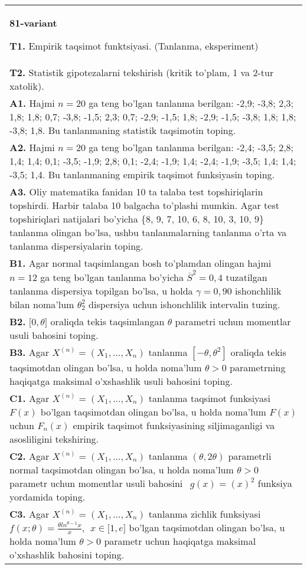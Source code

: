 \documentclass{article}
\begin{document}
\begin{tabular}{m{17cm}}
\textbf{81-variant}
\newline

\textbf{T1.} 
Empirik taqsimot funktsiyasi. (Tanlanma, eksperiment)
\\
\textbf{T2.} 
Statistik gipotezalarni tekshirish (kritik to'plam, 1 va 2-tur xatolik).
\\
\textbf{A1.} 
Hajmi \(n = 20\) ga teng bo'lgan tanlanma berilgan: -2,9; -3,8; 2,3; 1,8; 1,8; 0,7; -3,8; -1,5; 2,3; 0,7; -2,9; -1,5; 1,8; -2,9; -1,5; -3,8; 1,8; 1,8; -3,8; 1,8. Bu tanlanmaning statistik taqsimotin toping.
\\
\textbf{A2.} 
Hajmi \(n = 20\) ga teng bo'lgan tanlanma berilgan: -2,4; -3,5; 2,8; 1,4; 1,4; 0,1; -3,5; -1,9; 2,8; 0,1; -2,4; -1,9; 1,4; -2,4; -1,9; -3,5; 1,4; 1,4; -3,5; 1,4. Bu tanlanmaning empirik taqsimot funksiyasin toping.
\\
\textbf{A3.} 
Oliy matematika fanidan 10 ta talaba test topshiriqlarin topshirdi. Harbir talaba 10 balgacha to'plashi mumkin. Agar test topshiriqlari natijalari bo'yicha \{8, 9, 7, 10, 6, 8, 10, 3, 10, 9\} tanlanma olingan bo'lsa, ushbu tanlanmalarning tanlanma o'rta va tanlanma dispersiyalarin toping.
\\
\textbf{B1.} 
Agar normal taqsimlangan bosh to'plamdan olingan hajmi \(n = 12\) ga teng bo'lgan tanlanma bo'yicha \({\overline{S}}^{2} = 0,4\) tuzatilgan tanlanma dispersiya topilgan bo'lsa, u holda \(\gamma = 0,90\) ishonchlilik bilan noma'lum \(\theta_{2}^{2}\) dispersiya uchun ishonchlilik intervalin tuzing.
\\
\textbf{B2.} 
\(\lbrack 0,\theta\rbrack\) oraliqda tekis taqsimlangan \(\theta\) parametri uchun momentlar usuli bahosini toping.
\\
\textbf{B3.} 
Agar \(X^{(n)} = \left( X_{1},...,X_{n} \right)\) tanlanma \(\left\lbrack - \theta,\theta^{2} \right\rbrack\) oraliqda tekis taqsimotdan olingan bo'lsa, u holda noma'lum \(\theta > 0\) parametrning haqiqatga maksimal o'xshashlik usuli bahosini toping.
\\
\textbf{C1.} 
Agar \(X^{(n)} = \left( X_{1},...,X_{n} \right)\) tanlanma taqsimot funksiyasi \(F(x)\) bo'lgan taqsimotdan olingan bo'lsa, u holda noma'lum \(F(x)\) uchun \(F_{n}(x)\) empirik taqsimot funksiyasining siljimaganligi va asosliligini tekshiring.
\\
\textbf{C2.} 
Agar \(X^{(n)} = \left( X_{1},...,X_{n} \right)\) tanlanma \((\theta,2\theta)\) parametrli normal taqsimotdan olingan bo'lsa, u holda noma'lum \(\theta > 0\) parametr uchun momentlar usuli bahosini \(\ \ g(x) = (x)^{2}\) funksiya yordamida toping.
\\
\textbf{C3.} 
Agar \(X^{(n)} = \left( X_{1},...,X_{n} \right)\) tanlanma zichlik funksiyasi \(f(x;\theta) = \frac{\theta ln^{\theta - 1}x}{x},\ \ x \in \lbrack 1,e\rbrack\) bo'lgan taqsimotdan olingan bo'lsa, u holda noma'lum \(\theta > 0\) parametr uchun haqiqatga maksimal o'xshashlik bahosini toping.
\\

\end{tabular}
\vspace{1cm}
\end{document}
